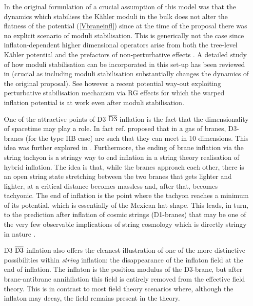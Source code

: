 In the original formulation of \cite{Burgess:2001fx,Dvali:2001fw} a crucial assumption of this model was that the dynamics which stabilises the K\"ahler moduli in the bulk does not alter the flatness of the potential (\ref{Vbraneinfl}) since at the time of the proposal there was no explicit scenario of moduli stabilisation. This is generically not the case since inflaton-dependent higher dimensional operators arise from both the tree-level K\"ahler potential and the prefactors of non-perturbative effects \cite{Kachru:2003sx}. A detailed study of how moduli stabilisation can be incorporated in this set-up has been reviewed in \cite{Baumann:2014nda} (crucial as including moduli stabilisation substantially changes the dynamics of the original proposal). See however a recent potential way-out exploiting perturbative stabilisation mechanism via RG effects \cite{Burgess:2022nbx} for which the warped inflation potential is at work even after moduli stabilisation.

One of the attractive points of D3-$\overline{{\rm D3}}$ inflation is the fact that the dimensionality of spacetime may play a role. In fact ref. \cite{Burgess:2001fx} proposed that in a gas of branes, D3-branes (for the type IIB case) are such that they can meet in 10 dimensions. This idea was further explored in \cite{Karch:2005yz, Durrer:2005nz}. Furthermore, the ending of brane inflation via the string tachyon is a stringy way to end inflation in a string theory realisation of hybrid inflation. The idea is that, while the branes approach each other, there is an open string state stretching between the two branes that gets lighter and lighter, at a critical distance becomes massless and, after that, becomes tachyonic. The end of inflation is the point where the tachyon reaches a minimum of its potential, which is essentially of the Mexican hat shape. This leads, in turn, to the prediction after inflation of cosmic strings (D1-branes) that may be one of the very few observable implications of 
string cosmology which is directly stringy in nature \cite{Sarangi:2002yt,Copeland:2003bj}.

D3-$\overline{{\rm D3}}$ inflation also offers the cleanest illustration of one of the more distinctive possibilities within \emph{string} inflation: the disappearance of the inflaton field at the end of inflation. The inflaton is the position modulus of the D3-brane, but after brane-antibrane annihilation this field is entirely removed from the effective field theory. This is in contrast to most field theory scenarios where, although the inflaton may decay, the field remains present in the theory.

